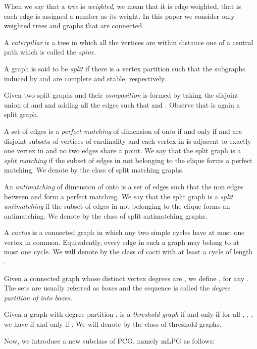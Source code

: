 \documentclass[dvipdfm]{llncs}
\begin{document}
When we say that a {\em tree}  is {\em weighted}, we mean that it is edge weighted, that is each edge is assigned a number as its weight. In this paper we consider only weighted trees and graphs that are connected.  


A {\em caterpillar} is a tree in which all the vertices are within distance one of a central path which is called the {\em spine}.


A graph  is said to be\textit{ split} if there is a vertex partition \mbox{} such that the subgraphs induced by  and  are complete and stable, respectively.  


Given two split graphs  and   their \textit{composition}  is formed by taking the disjoint union of  and  and adding all the edges   such that  and . Observe that  is again a split graph.


A set  of edges is a {\em perfect matching} of dimension  of  onto  if and only if  and  are disjoint subsets of vertices of cardinality  and each vertex in  is adjacent to exactly one vertex in  and no two edges share a point. We say that the split graph  is a  {\em split matching }if the subset of edges in  not belonging to the clique forms a perfect matching. We denote by  the class of split matching graphs.


An \textit{antimatching} of dimension  of  onto  is a set of edges such that the non edges between  and  form a perfect matching. We say that the split graph  is a \textit{split antimatching }if the subset of edges in  not belonging to the clique forms an antimatching. We denote by  the class of split antimatching graphs.


A {\em cactus} is a connected graph in which any two simple cycles have at most one vertex in common. Equivalently, every edge in such a graph may belong to at most one cycle. We will denote by  the class of cacti with at least a cycle of length .


Given a connected graph  whose distinct vertex degrees are \mbox{}, we define , for any .  The sets  are usually referred as {\em boxes }and the sequence  is called the \textit{degree partition of}  \textit{into boxes}. 


Given a graph  with  degree partition ,  is a  {\em threshold graph} if and only if for all , , , we have  if and only if . We will denote by  the class of threshold graphs. 


\smallskip

Now, we introduce a new subclass of PCG, namely mLPG as follows: 
\end{document}
